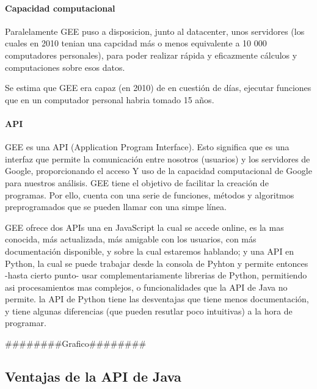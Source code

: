 \documentclass[
]{article}
\begin{document}
\hypertarget{capacidad-computacional}{%
\paragraph{Capacidad computacional}\label{capacidad-computacional}}

Paralelamente GEE puso a disposicion, junto al datacenter, unos
servidores (los cuales en 2010 tenian una capcidad más o menos
equivalente a 10 000 computadores personales), para poder realizar
rápida y eficazmente cálculos y computaciones sobre esos datos.

\begin{tipblock}
Se estima que GEE era capaz (en 2010) de en cuestión de días, ejecutar
funciones que en un computador personal habria tomado 15 años.

\end{tipblock}

\hypertarget{api}{%
\paragraph{API}\label{api}}

GEE es una API (Application Program Interface). Esto significa que es
una interfaz que permite la comunicación entre nosotros (usuarios) y los
servidores de Google, proporcionando el acceso Y uso de la capacidad
computacional de Google para nuestros análisis. GEE tiene el objetivo de
facilitar la creación de programas. Por ello, cuenta con una serie de
funciones, métodos y algoritmos preprogramados que se pueden llamar con
una simpe línea.

GEE ofrece dos APIs una en JavaScript la cual se accede online, es la
mas conocida, más actualizada, más amigable con los usuarios, con más
documentación disponible, y sobre la cual estaremos hablando; y una API
en Python, la cual se puede trabajar desde la consola de Pyhton y
permite entonces -hasta cierto punto- usar complementariamente librerias
de Python, permitiendo asi procesamientos mas complejos, o
funcionalidades que la API de Java no permite. la API de Python tiene
las desventajas que tiene menos documentación, y tiene algunas
diferencias (que pueden resutlar poco intuitivas) a la hora de
programar.

\#\#\#\#\#\#\#\#Grafico\#\#\#\#\#\#\#\#

\hypertarget{ventajas-de-la-api-de-java}{%
\subsection{Ventajas de la API de
Java}\label{ventajas-de-la-api-de-java}}
\end{document}
